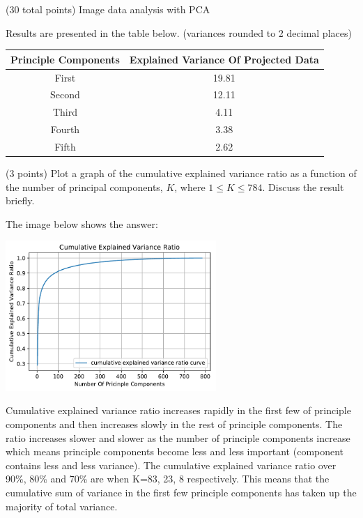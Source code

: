 \documentclass[12pt]{article}
\begin{document}
\begin{question}{(30 total points) Image data analysis with PCA}
\begin{subquestion}
    \begin{answerbox}{15em}
      Results are presented in the table below. (variances rounded to 2 decimal places)
      \begin{center}
      \begin{tabular}{|c|c|}
      \hline
      Principle Components & Explained Variance Of Projected Data\\
      \hline
      First & 19.81 \\
      Second & 12.11 \\
      Third & 4.11 \\
      Fourth & 3.38 \\
      Fifth & 2.62 \\
      \hline
      \end{tabular}
      \end{center}
    \end{answerbox}
    


   \end{subquestion}

   \begin{subquestion}{(3 points)
       Plot a graph of the cumulative explained variance ratio as a
       function of the number of principal components, $K$, where $1
       \le K \le 784$.
       Discuss the result briefly.
     } \label{Q1.plot.pca.variance}
   

      \begin{answerbox}{30em}
         The image below shows the answer:
         \begin{center}
         \includegraphics[width=0.6\textwidth]{CEVR.pdf}
         \end{center}
         Cumulative explained variance ratio increases rapidly in the first few of principle components and then increases slowly in the rest of principle components. The ratio increases slower and slower as the number of principle components increase which means principle components become less and less important (component contains less and less variance). The cumulative explained variance ratio over 90\%, 80\% and 70\% are when K=83, 23, 8 respectively. This means that the cumulative sum of variance in the first few principle components has taken up the majority of total variance.
      \end{answerbox}
  



\end{subquestion}
\end{question}
\end{document}
